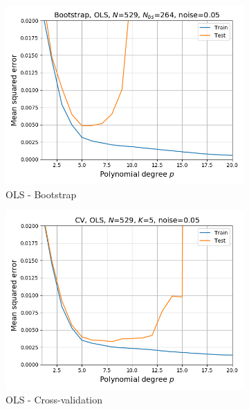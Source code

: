 \documentclass[a4paper]{article}
\begin{document}
\begin{figure}[H]
  \centering
  \begin{subfigure}{0.49\textwidth}
    \includegraphics[scale=0.45]{../figures/task_b/MSE_train_test_Bootstrap_train_test_N529_pmax20_nlamb1_noise0.05_seed4155_OLS_boot_Nbs264.png}
    \caption{OLS - Bootstrap}
  \end{subfigure}
  \begin{subfigure}{0.49\textwidth}
    \includegraphics[scale=0.45]{../figures/task_b/MSE_train_test_CV_train_test_N529_pmax20_nlamb1_noise0.05_seed4155_OLS_cv_k5.png}
    \caption{OLS - Cross-validation}
  \end{subfigure}\\
  \begin{subfigure}{0.49\textwidth}

\end{subfigure}
\end{figure}
\end{document}
